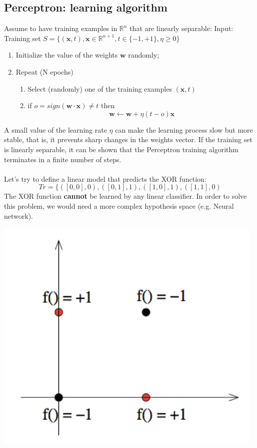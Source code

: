 \subsection{Perceptron: learning algorithm}
Assume to have training examples in $\mathbb{R}^{n}$ that are linearly separable:\newline\newline
Input: Training set $S = \{(\textbf{x}, t), \textbf{x} \in \mathbb{R}^{n+1}, t \in \{-1, +1\}, \eta \geq 0\}$
\begin{enumerate}
    \item Initialize the value of the weights $\textbf{w}$ randomly;
    \item Repeat (N epochs)
    \begin{enumerate}
        \item Select (randomly) one of the training examples $(\textbf{x}, t)$
        \item if $o = sign(\textbf{w} \cdot \textbf{x}) \neq t$ then
        \[\textbf{w} \leftarrow \textbf{w} + \eta(t-o)\textbf{x}\]
    \end{enumerate}
\end{enumerate}
A small value of the learning rate $\eta$ can make the learning process slow but more stable, that is, it prevents sharp changes in the weights vector. If the training set is linearly separable, it can be shown that the Perceptron training algorithm terminates in a finite number of steps.\\\\
Let’s try to define a linear model that predicts the XOR function:
\[Tr = \{ ([0,0], 0), ([0, 1], 1), ([1,0],1), ([1,1], 0)\]
The XOR function \textbf{cannot} be learned by any linear classifier. In order to solve this problem, we would need a more complex hypothesis space (e.g. Neural network).
\begin{center}
    \includegraphics[scale=0.8]{images/xor.png}
\end{center}

